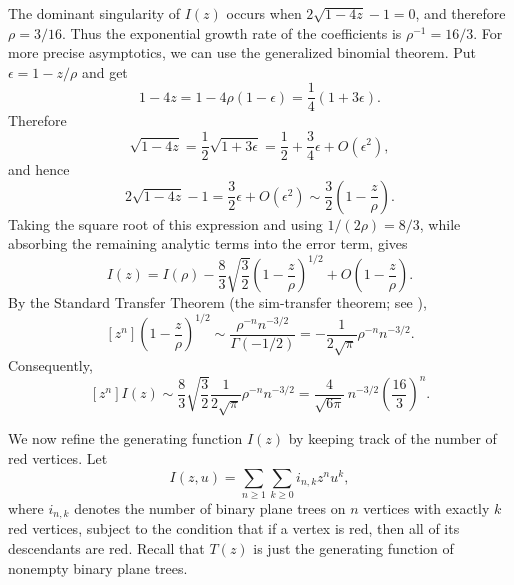 \documentclass[10pt,a4paper]{amsart}
\theoremstyle{remark}
\begin{document}
The dominant singularity of $I(z)$ occurs when $2\sqrt{1-4z}-1=0$, and therefore $\rho=3/16$. Thus the exponential growth rate of the coefficients is $\rho^{-1}=16/3$.
For more precise asymptotics, we can use the generalized binomial theorem.  Put $\epsilon=1-z/\rho$ and get
\[
1-4z
=1-4\rho(1-\epsilon)
=\frac14(1+3\epsilon).
\]
Therefore
\[
\sqrt{1-4z}
=\frac12\sqrt{1+3\epsilon}
=\frac12+\frac34\epsilon+O(\epsilon^2),
\]
and hence
\begin{equation} \label{firstrate}
2\sqrt{1-4z}-1
=\frac32\epsilon+O(\epsilon^2)
\sim \frac{3}{2}\left(1-\frac{z}{\rho}\right).
\end{equation}
Taking the square root of this expression and using $1/(2\rho)=8/3$, while absorbing the remaining analytic terms into the error term, gives
\[
I(z) = I(\rho) -\frac{8}{3}\sqrt{\frac32}
\left(1-\frac{z}{\rho}\right)^{1/2}
+O\left(1-\frac{z}{\rho}\right).
\]
By the Standard Transfer Theorem (the sim-transfer theorem; see
\cite[Corollary VI.1]{FlajoletSedgewick}),
\[
[z^n]\left(1-\frac{z}{\rho}\right)^{1/2}
\sim
\frac{\rho^{-n}n^{-3/2}}{\Gamma(-1/2)}
=-\frac{1}{2\sqrt{\pi}}\rho^{-n}n^{-3/2}.
\]
Consequently,
\begin{equation}
\label{eq:asympBinary}
[z^n]I(z)
\sim
\frac{8}{3}\sqrt{\frac32}\frac{1}{2\sqrt{\pi}}
\rho^{-n}n^{-3/2}
=
\frac{4}{\sqrt{6\pi}}\,n^{-3/2}
\left(\frac{16}{3}\right)^n.
\end{equation}

We now refine the generating function $I(z)$ by keeping track of the number of red vertices. Let \[ I(z,u)=\sum_{n\geq 1}\sum_{k\geq 0} i_{n,k} z^n u^k, \] where $i_{n,k}$ denotes the number of binary plane trees on $n$ vertices with exactly $k$ red vertices, subject to the condition that if a vertex is red, then all of its descendants are red. Recall that $T(z)$ is just the generating function of nonempty binary plane trees. 
\end{document}
